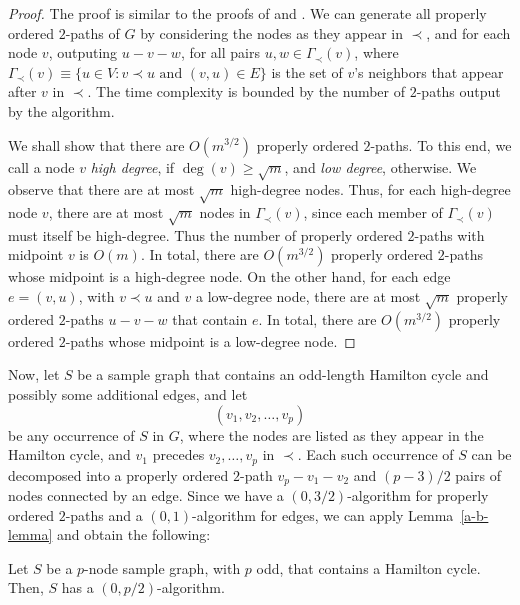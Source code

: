 \begin{proof}
The proof is similar to the proofs of \cite[Theorem~3.5]{AYZ97} and \cite[Theorem~2]{Schank07}. We can generate all properly ordered $2$-paths of $G$ by considering the nodes as they appear in $\prec$, and for each node $v$, outputing $u - v - w$, for all pairs $u, w \in \Gamma_{\prec}(v)$, where $\Gamma_{\prec}(v) \equiv \{ u \in V : v \prec u \mbox{ and } (v, u) \in E\}$ is the set of $v$'s neighbors that appear after $v$ in $\prec$. The time complexity is bounded by the number of $2$-paths output by the algorithm.

We shall show that there are $O(m^{3/2})$ properly ordered $2$-paths. To this end, we call a node $v$ \emph{high degree}, if $\deg(v) \geq \sqrt{m}$, and \emph{low degree}, otherwise. We observe that there are at most $\sqrt{m}$ high-degree nodes. Thus, for each high-degree node $v$, there are at most $\sqrt{m}$ nodes in $\Gamma_{\prec}(v)$, since each member of $\Gamma_{\prec}(v)$ must itself be high-degree. Thus the number of properly ordered $2$-paths with midpoint $v$ is $O(m)$. In total, there are $O(m^{3/2})$ properly ordered $2$-paths whose midpoint is a high-degree node.
On the other hand, for each edge $e = (v, u)$, with $v \prec u$ and $v$ a low-degree node, there are at most $\sqrt{m}$ properly ordered $2$-paths $u - v - w$ that contain $e$. In total, there are $O(m^{3/2})$ properly ordered $2$-paths whose midpoint is a low-degree node.
\end{proof}

Now, let $S$ be a sample graph that contains an odd-length Hamilton cycle and possibly some additional edges, and let
$$(v_1, v_2, \ldots, v_p)$$
be any occurrence of $S$ in $G$, where the nodes are listed as they appear in the Hamilton cycle, and $v_1$ precedes $v_2, \ldots, v_p$ in $\prec$. Each such occurrence of $S$ can be decomposed into a properly ordered $2$-path $v_p - v_1 - v_2$ and $(p-3)/2$ pairs of nodes connected by an edge. Since we have a $(0, 3/2)$-algorithm for properly ordered $2$-paths and a $(0, 1)$-algorithm for edges, we can apply Lemma~\ref{a-b-lemma} and obtain the following:

\begin{theorem}\label{cor-oddenum}
Let $S$ be a $p$-node sample graph, with $p$ odd, that contains a Hamilton cycle. Then, $S$ has a $(0, p/2)$-algorithm.
\end{theorem}

